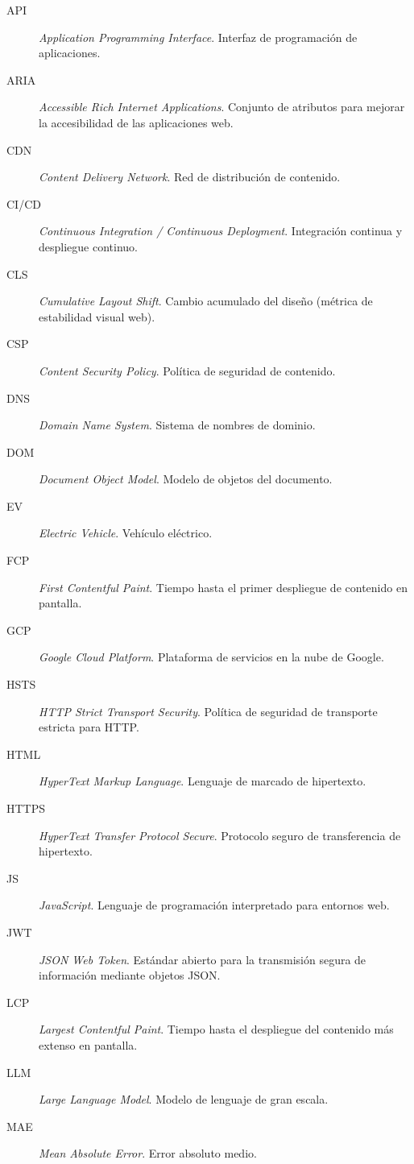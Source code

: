 \documentclass{memoriaPFC}
\begin{document}
\begin{description}
  \item[API] \textit{Application Programming Interface}. Interfaz de programación de aplicaciones.
  \item[ARIA] \textit{Accessible Rich Internet Applications}. Conjunto de atributos para mejorar la accesibilidad de las aplicaciones web.
  \item[CDN] \textit{Content Delivery Network}. Red de distribución de contenido.
  \item[CI/CD] \textit{Continuous Integration / Continuous Deployment}. Integración continua y despliegue continuo.
  \item[CLS] \textit{Cumulative Layout Shift}. Cambio acumulado del diseño (métrica de estabilidad visual web).
  \item[CSP] \textit{Content Security Policy}. Política de seguridad de contenido.
  \item[DNS] \textit{Domain Name System}. Sistema de nombres de dominio.
  \item[DOM] \textit{Document Object Model}. Modelo de objetos del documento.
  \item[EV] \textit{Electric Vehicle}. Vehículo eléctrico.
  \item[FCP] \textit{First Contentful Paint}. Tiempo hasta el primer despliegue de contenido en pantalla.
  \item[GCP] \textit{Google Cloud Platform}. Plataforma de servicios en la nube de Google.
  \item[HSTS] \textit{HTTP Strict Transport Security}. Política de seguridad de transporte estricta para HTTP.
  \item[HTML] \textit{HyperText Markup Language}. Lenguaje de marcado de hipertexto.
  \item[HTTPS] \textit{HyperText Transfer Protocol Secure}. Protocolo seguro de transferencia de hipertexto.
  \item[JS] \textit{JavaScript}. Lenguaje de programación interpretado para entornos web.
  \item[JWT] \textit{JSON Web Token}. Estándar abierto para la transmisión segura de información mediante objetos JSON.
  \item[LCP] \textit{Largest Contentful Paint}. Tiempo hasta el despliegue del contenido más extenso en pantalla.
  \item[LLM] \textit{Large Language Model}. Modelo de lenguaje de gran escala.
  \item[MAE] \textit{Mean Absolute Error}. Error absoluto medio.

\end{description}
\end{document}
